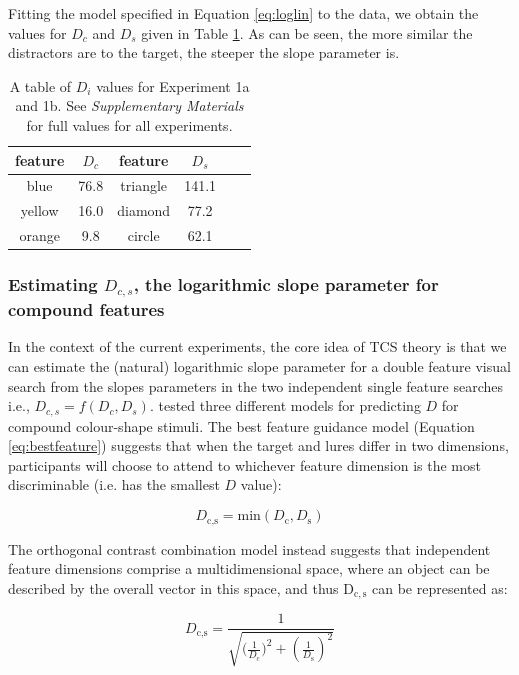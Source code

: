 \documentclass[preprint,12pt,authoryear]{elsarticle}
\begin{document}
Fitting the model specified in Equation \ref{eq:loglin} to the data, we obtain the values for $D_c$ and $D_s$ given in Table \ref{tab:reimp_Dc_Ds}. As can be seen, the more similar the distractors are to the target, the steeper the slope parameter is. 

\begin{table}[h]
\centering
\begin{tabular}{ ccc|ccc } 
feature & $D_c$ & feature & $D_s$\\
 \hline 
blue & 76.8 & triangle & 141.1\\
yellow & 16.0 & diamond & 77.2\\
orange & 9.8  & circle & 62.1\\
\end{tabular}
\caption{A table of $D_i$ values for Experiment 1a and 1b. See \textit{Supplementary Materials} for full values for all experiments.}
\label{tab:reimp_Dc_Ds}
\end{table}

\subsubsection{Estimating $D_{c,s}$, the logarithmic slope parameter for compound features}

In the context of the current experiments, the core idea of TCS theory is that we can estimate the (natural) logarithmic slope parameter for a double feature visual search from the slopes parameters in the two independent single feature searches i.e., $D_{c,s} = f(D_c, D_s)$. \cite{buetti2019predicting} tested three different models for predicting $D$ for compound colour-shape stimuli. The best feature guidance model (Equation \ref{eq:bestfeature}) suggests that when the target and lures differ in two dimensions, participants will choose to attend to whichever feature dimension is the most discriminable (i.e. has the smallest $D$ value):

\begin{equation}
D_\text{c,s} = \text{min}\left(D_\text{c}, D_\text{s}\right)
\label{eq:bestfeature}
\end{equation}

The orthogonal contrast combination model instead suggests that independent feature dimensions comprise a multidimensional space, where an object can be described by the overall vector in this space, and thus $\mathrm{D_{c,s}}$ can be represented as:

\begin{equation}
D_\text{c,s} = \frac{1}{\sqrt{{(\frac{1}{D_\text{c}}})^2 + (\frac{1}{D_\text{s}})^2}}
\label{eq:orthogonalcontrast}
\end{equation}
\end{document}
